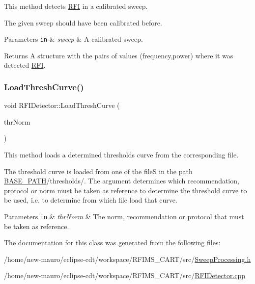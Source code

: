 This method detects \hyperlink{structRFI}{R\+FI} in a calibrated sweep. 

The given sweep should have been calibrated before. 
\begin{DoxyParams}[1]{Parameters}
\mbox{\tt in}  & {\em sweep} & A calibrated sweep. \\
\hline
\end{DoxyParams}
\begin{DoxyReturn}{Returns}
A structure with the pairs of values (frequency,power) where it was detected \hyperlink{structRFI}{R\+FI}. 
\end{DoxyReturn}
\mbox{\label{classRFIDetector_a1eba12febd92bba77f658dfe664ea5c6}} 
\subsubsection{\texorpdfstring{Load\+Thresh\+Curve()}{LoadThreshCurve()}}
{\footnotesize\ttfamily void R\+F\+I\+Detector\+::\+Load\+Thresh\+Curve (\begin{DoxyParamCaption}\item[{const \hyperlink{structRFI_a18cfa7d24274bbcd14acc6b513860cb0}{R\+F\+I\+::\+Thresholds\+Norm}}]{thr\+Norm }\end{DoxyParamCaption})}



This method loads a determined thresholds curve from the corresponding file. 

The threshold curve is loaded from one of the fileS in the path \hyperlink{Basics_8h_a0423f4cb393331ce0b9f6b3a43adcaae}{B\+A\+S\+E\+\_\+\+P\+A\+TH}/thresholds/. The argument determines which recommendation, protocol or norm must be taken as reference to determine the threshold curve to be used, i.\+e. to determine from which file load that curve. 
\begin{DoxyParams}[1]{Parameters}
\mbox{\tt in}  & {\em thr\+Norm} & The norm, recommendation or protocol that must be taken as reference. \\
\hline
\end{DoxyParams}


The documentation for this class was generated from the following files\+:\begin{DoxyCompactItemize}
\item 
/home/new-\/mauro/eclipse-\/cdt/workspace/\+R\+F\+I\+M\+S\+\_\+\+C\+A\+R\+T/src/\hyperlink{SweepProcessing_8h}{Sweep\+Processing.\+h}\item 
/home/new-\/mauro/eclipse-\/cdt/workspace/\+R\+F\+I\+M\+S\+\_\+\+C\+A\+R\+T/src/\hyperlink{RFIDetector_8cpp}{R\+F\+I\+Detector.\+cpp}\end{DoxyCompactItemize}
